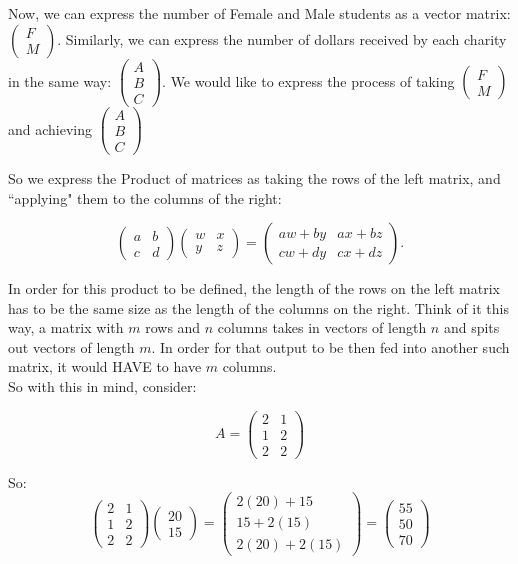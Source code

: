\documentclass[10pt]{article}
\theoremstyle{definition}
\begin{document}
Now, we can express the number of Female and Male students as a vector matrix: $\begin{pmatrix} F \\ M\end{pmatrix}$.  Similarly, we can express the number of dollars received by each charity in the same way: $\begin{pmatrix} A\\ B\\ C \end{pmatrix}$.  We would like to express the process of taking $\begin{pmatrix} F \\ M\end{pmatrix}$ and achieving $\begin{pmatrix} A\\ B\\ C \end{pmatrix}$

So we express the Product of matrices as taking the rows of  the left matrix, and ``applying" them to the columns of the right:

$$\begin{pmatrix} a&b \\ c&d\end{pmatrix}\begin{pmatrix} w & x \\ y & z\end{pmatrix}=\begin{pmatrix}aw+by & ax+bz \\ cw+dy & cx+dz  \end{pmatrix}.$$

In order for this product to be defined, the length of the rows on the left matrix has to be the same size as the length of the columns on the right.  Think of it this way, a matrix with $m$ rows and $n$ columns takes in vectors of length $n$ and spits out vectors of length $m$.  In order for that output to be then fed into another such matrix, it would HAVE to have $m$ columns.\\

So with this in mind, consider:

$$A=\begin{pmatrix} 2 & 1 \\ 1 & 2 \\ 2 & 2\end{pmatrix}$$

So: $$\begin{pmatrix} 2 & 1 \\ 1 & 2 \\ 2 & 2\end{pmatrix}\begin{pmatrix} 20 \\ 15\end{pmatrix}=\begin{pmatrix} 2(20)+15 \\ 15+2(15) \\ 2(20)+2(15)\end{pmatrix}=\begin{pmatrix} 55\\50\\70\end{pmatrix}$$
\end{document}
